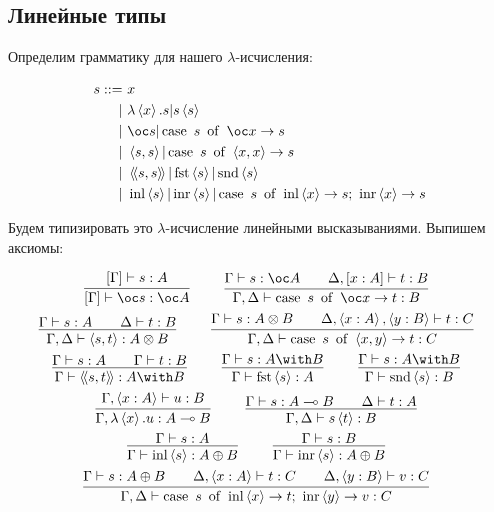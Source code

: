 \subsection{\texorpdfstring{Линейные типы}{Linear types}}
Определим грамматику для нашего $\lambda$-исчисления:
\begin{bnf}
\begin{alignat*}{2}
	s ::= &\ x \\
			  | &\ \lambda\pair{x}.s | s\pair{s} \\
			  | &\ \oc s | \caseb{s}{\oc x \rightarrow s} \\
			  | &\ \pair{s,s} | \caseb{s}{\pair{x,x} \rightarrow s} \\
			  | &\ \ppair{s,s} | \fst \pair{s} | \snd \pair{s} \\
			  | &\ \inl \pair{s} | \inr \pair{s}|
                    \casec{s}{\inl \pair{x} \rightarrow s}{\inr \pair{x} \rightarrow s}
\end{alignat*}
\end{bnf}
Будем типизировать это $\lambda$-исчисление линейными высказываниями. Выпишем аксиомы:
\begin{@empty}
\inferspacing
\begin{gather*}
	\infer[]
		{[\Gamma]\vdash \oc s : \oc A}
		{[\Gamma]\vdash s : A} \qquad
	\infer[]
		{\Gamma, \Delta\vdash \caseb{s}{\oc x \rightarrow t} : B}
		{\Gamma\vdash s : \oc A && \Delta, [x : A]\vdash t : B} \\
	\infer[]
		{\Gamma, \Delta\vdash \pair{s, t} : A \otimes B}
		{\Gamma \vdash s : A && \Delta\vdash t : B} \qquad
	\infer[]
		{\Gamma, \Delta \vdash \caseb{s}{\pair{x, y} \rightarrow t} : C}
		{\Gamma\vdash s : A \otimes B && \Delta, \pair{x : A}, \pair{y : B} \vdash t : C} \\
	\infer[]{\Gamma \vdash \ppair{s, t} : A \with B}{\Gamma \vdash s : A && \Gamma \vdash t : B} \qquad
	\infer[]{\Gamma \vdash \fst \pair{s} : A}{\Gamma \vdash s : A \with B} \qquad
	\infer[]{\Gamma \vdash \snd \pair{s} : B}{\Gamma \vdash s : A \with B} \\
	\infer[]{\Gamma, \lambda\pair{x}.u : A \multimap B}{\Gamma, \pair{x : A} \vdash u : B} \qquad
	\infer[]{\Gamma, \Delta \vdash  s \pair{t} : B}{\Gamma \vdash s : A \multimap B && \Delta \vdash t : A} \\
	\infer[]{\Gamma \vdash \inl \pair{s} : A \oplus B}{\Gamma \vdash s : A} \qquad
	\infer[]{\Gamma \vdash \inr \pair{s} : A \oplus B}{\Gamma \vdash s : B} \\
	\infer[]
		{\Gamma, \Delta \vdash \casec{s}{\inl \pair{x} \rightarrow t}{\inr \pair{y} \rightarrow v} : C}
		{\Gamma \vdash s : A \oplus B && \Delta, \pair{x : A} \vdash t : C && \Delta, \pair{y : B} \vdash v : C}
\end{gather*}
\end{@empty}
